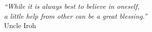 \cleardoublepage
\thispagestyle{plain}

\vspace*{8cm}

\begin{flushright}
  \textsl{``While it is always best to believe in oneself, \\
  a little help from other can be a great blessing.''}\\
\vspace*{1.5cm}
    Uncle Iroh
\end{flushright}
